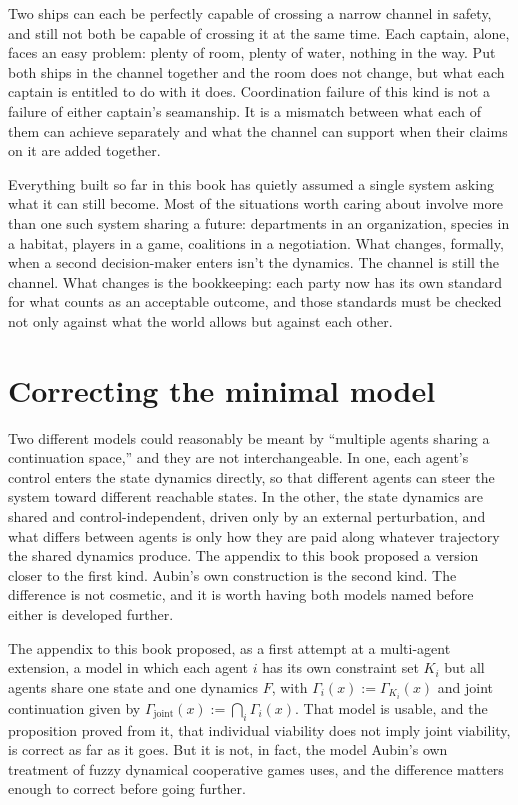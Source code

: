\documentclass[11pt]{report}
\begin{document}
Two ships can each be perfectly capable of crossing a narrow channel in
safety, and still not both be capable of crossing it at the same time.
Each captain, alone, faces an easy problem: plenty of room, plenty of
water, nothing in the way. Put both ships in the channel together and
the room does not change, but what each captain is entitled to do with
it does. Coordination failure of this kind is not a failure of either
captain's seamanship. It is a mismatch between what each of them can
achieve separately and what the channel can support when their claims
on it are added together.

Everything built so far in this book has quietly assumed a single
system asking what it can still become. Most of the situations worth
caring about involve more than one such system sharing a future:
departments in an organization, species in a habitat, players in a
game, coalitions in a negotiation. What changes, formally, when a
second decision-maker enters isn't the dynamics. The channel is
still the channel. What changes is the bookkeeping: each party now has its own
standard for what counts as an acceptable outcome, and those standards
must be checked not only against what the world allows but against
each other.

\section*{Correcting the minimal model}

Two different models could reasonably be meant by ``multiple agents
sharing a continuation space,'' and they are not interchangeable.
In one, each agent's control enters the state dynamics directly, so
that different agents can steer the system toward different reachable
states. In the other, the state dynamics are shared and
control-independent, driven only by an external perturbation, and what
differs between agents is only how they are paid along whatever
trajectory the shared dynamics produce. The appendix to this book
proposed a version closer to the first kind. Aubin's own construction
is the second kind. The difference is not cosmetic, and it is worth
having both models named before either is developed further.

The appendix to this book proposed, as a first attempt at a multi-agent
extension, a model in which each agent $i$ has its own constraint set
$K_i$ but all agents share one state and one dynamics $F$, with
$\Gamma_i(x) := \Gamma_{K_i}(x)$ and joint continuation given by
$\Gamma_{\mathrm{joint}}(x) := \bigcap_i \Gamma_i(x)$. That model is
usable, and the proposition proved from it, that individual viability
does not imply joint viability, is correct as far as it goes. But it
is not, in fact, the model Aubin's own
treatment of fuzzy dynamical cooperative games uses, and the difference
matters enough to correct before going further.
\end{document}
